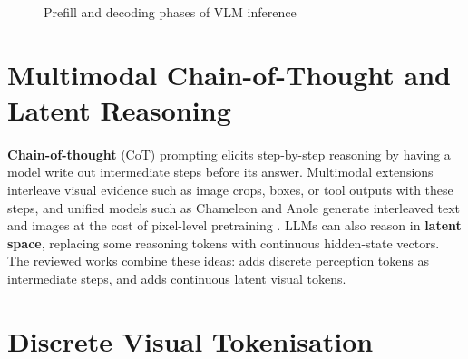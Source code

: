 \documentclass[12pt,a4paper,final]{extreport}
\begin{document}
\begin{figure}[htbp]
\centering
{}
\caption{Prefill and decoding phases of VLM inference}
\label{fig:prefill}
\end{figure}

\section{Multimodal Chain-of-Thought and Latent Reasoning}

\paragraph{} \textbf{Chain-of-thought} (CoT) prompting \cite{wei2022} elicits step-by-step reasoning by having a model write out intermediate steps before its answer. Multimodal extensions interleave visual evidence such as image crops, boxes, or tool outputs with these steps, and unified models such as Chameleon and Anole generate interleaved text and images at the cost of pixel-level pretraining \cite{p1}. LLMs can also reason in \textbf{latent space}, replacing some reasoning tokens with continuous hidden-state vectors. The reviewed works combine these ideas: \cite{p2} adds discrete perception tokens as intermediate steps, and \cite{p1} adds continuous latent visual tokens.

\section{Discrete Visual Tokenisation}
\end{document}
